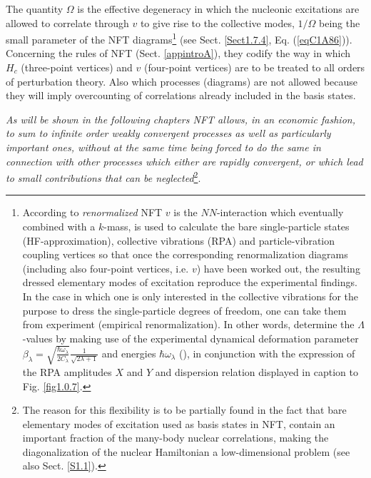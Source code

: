 The quantity $\Omega$ is the effective degeneracy in which the nucleonic excitations are allowed to correlate through $v$ to give rise to the collective modes, $1/\Omega$ being the small parameter of the NFT diagrams\footnote{According to \textit{renormalized} NFT $v$ is the $NN$-interaction which eventually combined with a $k$-mass, is used to calculate the bare single-particle states (HF-approximation), collective vibrations (RPA) and particle-vibration coupling vertices so that once the corresponding renormalization  diagrams (including also four-point vertices, i.e. $v$) have been worked out, the resulting dressed elementary modes of excitation reproduce the experimental findings. In the case in which  one is only interested in the collective vibrations for the purpose to dress the single-particle degrees of freedom, one can take them from experiment (empirical renormalization). In other words, determine the $\Lambda$-values by making use of the experimental dynamical deformation parameter $\beta_\lambda=\sqrt{\frac{\hbar\omega_\lambda}{2C_\lambda}}\frac{1}{\sqrt{2\lambda+1}}$ and energies $\hbar\omega_\lambda$ (\cite{Broglia:16}), in conjunction with the expression of the RPA amplitudes $X$ and $Y$ and dispersion relation displayed in caption to Fig. \ref{fig1.0.7}.} (see Sect. \ref{Sect1.7.4}, Eq. (\ref{eqC1A86})). Concerning the rules of NFT (Sect. \ref{appintroA}), they codify the way in which $H_c$ (three-point vertices) and $v$ (four-point vertices)  are to be treated to all orders of perturbation theory. Also which processes (diagrams) are not allowed because they will imply overcounting of correlations already included in the basis states. 

\textit{As will be shown in the following chapters NFT allows, in an economic fashion, to sum to infinite order weakly convergent processes as well as particularly important ones, without at the same time being forced to do the same in connection with other processes which either are rapidly convergent, or which lead to small contributions that can be neglected}\footnote{The reason for this flexibility is to be partially found in the fact that bare elementary modes of excitation used as basis states in NFT, contain an important fraction of the many-body nuclear correlations, making the diagonalization of the nuclear Hamiltonian a low-dimensional problem (see also Sect. \ref{S1.1}).}.

